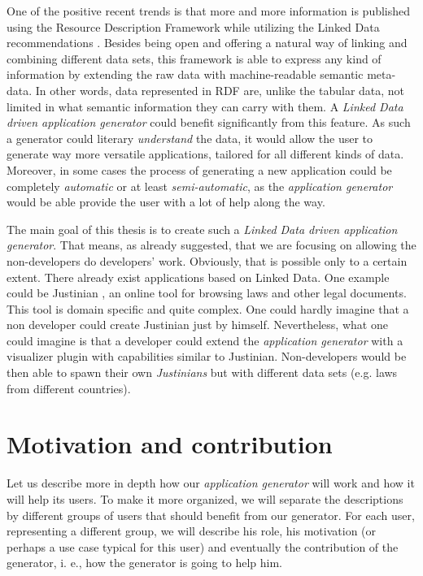 One of the positive recent trends is that more and more information is published using the Resource Description Framework \cite{rdf} while utilizing the Linked Data recommendations \cite{ld}. Besides being open and offering a natural way of linking and combining different data sets, this framework is able to express any kind of information by extending the raw data with machine-readable semantic meta-data. In other words, data represented in RDF are, unlike the tabular data, not limited in what semantic information they can carry with them. A \emph{Linked Data driven application generator} could benefit significantly from this feature. As such a generator could literary \emph{understand} the data, it would allow the user to generate way more versatile applications, tailored for all different kinds of data. Moreover, in some cases the process of generating a new application could be completely \emph{automatic} or at least \emph{semi-automatic}, as the \emph{application generator} would be able provide the user with a lot of help along the way.

The main goal of this thesis is to create such a \emph{Linked Data driven application generator}. That means, as already suggested, that we are focusing on allowing the non-developers do developers' work. Obviously, that is possible only to a certain extent. There already exist applications based on Linked Data. One example could be Justinian \cite{justinian}, an online tool for browsing laws and other legal documents. This tool is domain specific and quite complex. One could hardly imagine that a non developer could create Justinian just by himself. Nevertheless, what one could imagine is that a developer could extend the \emph{application generator} with a visualizer plugin with capabilities similar to Justinian. Non-developers would be then able to spawn their own \emph{Justinians} but with different data sets (e.g. laws from different countries).

\section*{Motivation and contribution}

Let us describe more in depth how our \emph{application generator} will work and how it will help its users. To make it more organized, we will separate the descriptions by different groups of users that should benefit from our generator. For each user, representing a different group, we will describe his role, his motivation (or perhaps a use case typical for this user) and eventually the contribution of the generator, i. e., how the generator is going to help him.

